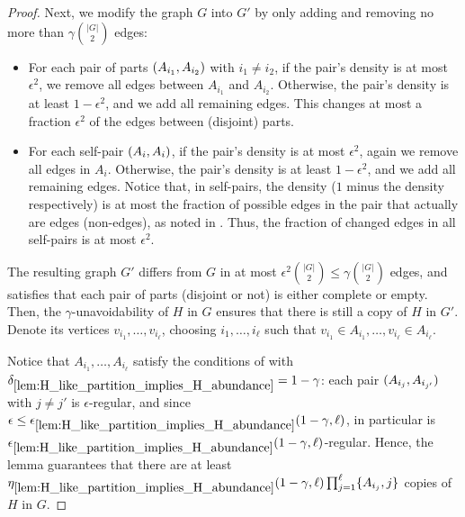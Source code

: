 \begin{theorem}
\begin{proof}
                Next, we modify the graph $G$ into $G'$ by only adding and removing no more than $\gamma {|G| \choose 2}$
                edges:
                \begin{itemize}
                    \item For each pair of parts $( A_{i_1}, A_{i_2} )$ with $i_1 \neq i_2$, if the pair's density is
                        at most $\epsilon^2$, we remove all edges between $A_{i_1}$ and $A_{i_2}$.
                        Otherwise, the pair's density is at least $1 - \epsilon^2$, and we add all remaining edges.
                        This changes at most a fraction $\epsilon^2$ of the edges between (disjoint) parts.
                    \item For each self-pair $( A_i, A_i )$, if the pair's density is at most $\epsilon^2$, again we
                        remove all edges in $A_i$.
                        Otherwise, the pair's density is at least $1 - \epsilon^2$, and we add all remaining edges.
                        Notice that, in self-pairs, the density ($1$ minus the density respectively) is at most
                        the fraction of possible edges in the pair that actually are edges (non-edges), as noted in
                        .
                        Thus, the fraction of changed edges in all self-pairs is at most $\epsilon^2$.
                \end{itemize}
                The resulting graph $G'$ differs from $G$ in at most $\epsilon^2 {|G| \choose 2} \leq \gamma {|G| \choose 2}$
                edges, and satisfies that each pair of parts (disjoint or not) is either complete or empty.
                Then, the $\gamma$-unavoidability of $H$ in $G$ ensures that there is still a copy of $H$ in $G'$.
                Denote its vertices $v_{i_1}, \dots, v_{i_\ell}$, choosing $i_1, \dots, i_\ell$ such that
                $v_{i_1} \in A_{i_1}, \dots, v_{i_\ell} \in A_{i_\ell}$.

                Notice that $A_{i_1}, \dots, A_{i_\ell}$ satisfy the conditions of 
                with $\delta_{\ref{lem:H_like_partition_implies_H_abundance}} = 1 - \gamma$:
                each pair $( A_{i_j}, A_{i_{j'}} )$ with $j \neq j'$ is $\epsilon$-regular,
                and since $\epsilon \leq \epsilon_{\ref{lem:H_like_partition_implies_H_abundance}} ( 1 - \gamma, \ell )$,
                in particular is $\epsilon_{\ref{lem:H_like_partition_implies_H_abundance}} ( 1 - \gamma, \ell )$-regular.
                Hence, the lemma guarantees that there are at least $\eta_{\ref{lem:H_like_partition_implies_H_abundance}}
                    ( 1 - \gamma, \ell ) \prod_{j=1}^\ell \{ A_{i_j},j \}$
                copies of $H$ in $G$.


\end{proof}
\end{theorem}
